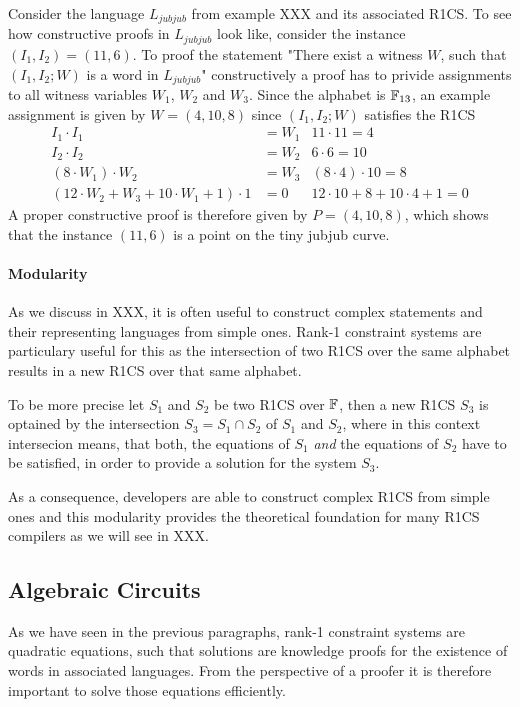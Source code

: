 \begin{example} Consider the language $L_{jubjub}$ from example XXX and its associated R1CS. To see how constructive proofs in $L_{jubjub}$ look like, consider the instance $(I_1,I_2)= (11,6)$. To proof the statement "There exist a witness $W$, such that $(I_1,I_2;W)$ is a word in $L_{jubjub}$" constructively a proof has to privide assignments to all witness variables $W_1$, $W_2$ and $W_3$. Since the alphabet is $\mathbb{F}_{13}$, an example assignment is given by
$W=(4,10,8)$ since $(I_1,I_2;W)$ satisfies the R1CS
\begin{align*}
I_1 \cdot I_1 & = W_1 & 11\cdot 11 = 4\\
I_2 \cdot I_2 & = W_2 & 6 \cdot 6 = 10 \\
(8 \cdot W_1) \cdot W_2 & = W_3 & (8\cdot 4)\cdot 10 = 8\\
(12\cdot W_2 + W_3 + 10\cdot W_1 + 1)\cdot 1 & = 0 & 12\cdot 10 + 8 + 10\cdot 4 + 1 = 0
\end{align*}
A proper constructive proof is therefore given by $P=(4,10,8)$, which shows that the instance $(11,6)$ is a point on the tiny jubjub curve. 
\end{example}
\paragraph{Modularity} As we discuss in XXX, it is often useful to construct complex statements and their representing languages from simple ones. Rank-1 constraint systems are particulary useful for this as the intersection of two R1CS over the same alphabet results in a new R1CS over that same alphabet. 

To be more precise let $S_1$ and $S_2$ be two R1CS over $\mathbb{F}$, then a new R1CS $S_3$ is optained by the intersection $S_3 = S_1\cap S_2$  of $S_1$ and $S_2$, where in this context intersecion means, that both, the equations of $S_1$ \textit{and} the equations of $S_2$ have to be satisfied, in order to provide a solution for the system $S_3$.

As a consequence, developers are able to construct complex R1CS from simple ones and this modularity provides the theoretical foundation for many R1CS compilers as we will see in XXX.

\subsection{Algebraic Circuits} As we have seen in the previous paragraphs, rank-1 constraint systems are quadratic equations, such that solutions are knowledge proofs for the existence of words in associated languages. From the perspective of a proofer it is therefore important to solve those equations efficiently. 

